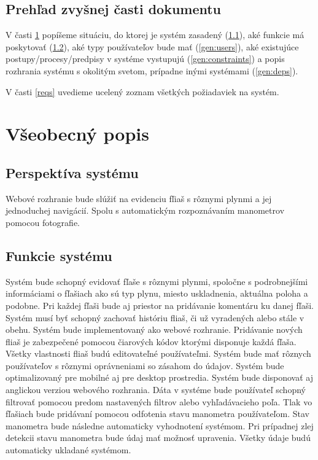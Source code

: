 \documentclass[hreffootnote]{zah}
\begin{document}
\subsection{Prehľad zvyšnej časti dokumentu}

V časti \ref{general} popíšeme situáciu, do ktorej je systém zasadený (\ref{gen:perspective}), aké funkcie má poskytovať (\ref{gen:functions}), aké typy používateľov bude mať (\ref{gen:users}), aké existujúce postupy/procesy/predpisy v systéme vystupujú (\ref{gen:constraints}) a popis rozhrania systému s okolitým svetom, prípadne inými systémami (\ref{gen:deps}).

V časti \ref{reqs} uvedieme ucelený zoznam všetkých požiadaviek na systém.

\cleardoublepage
\section{Všeobecný popis}
\label{general}

\subsection{Perspektíva systému}
\label{gen:perspective}
Webové rozhranie bude slúžiť na evidenciu fľiaš s rôznymi plynmi a jej jednoduchej navigácií. Spolu s automatickým rozpoznávaním manometrov pomocou fotografie.

\subsection{Funkcie systému}
\label{gen:functions}
Systém bude schopný evidovať fľaše s rôznymi plynmi, spoločne s podrobnejšími informáciami o fľašiach ako sú typ plynu, miesto uskladnenia, aktuálna poloha a podobne. Pri každej fľaši bude aj priestor na pridávanie komentáru ku danej fľaši. Systém musí byť schopný zachovať históriu fliaš, či už vyradených alebo stále v obehu. Systém bude implementovaný ako webové rozhranie. Pridávanie nových fliaš je zabezpečené pomocou čiarových kódov ktorými disponuje každá fľaša. Všetky vlastnosti fliaš budú editovateľné používateľmi. Systém bude mať rôznych používateľov s rôznymi oprávneniami so zásahom do údajov. Systém bude optimalizovaný pre mobilné aj pre desktop prostredia. Systém bude disponovať aj anglickou verziou webového rozhrania. Dáta v systéme bude používateľ schopný filtrovať pomocou predom nastavených filtrov alebo vyhľadávacieho poľa. Tlak vo fľašiach bude pridávaní pomocou odfotenia stavu manometra používateľom. Stav manometra bude následne automaticky vyhodnotení systémom. Pri prípadnej zlej detekcii stavu manometra bude údaj mať možnosť upravenia. Všetky údaje budú automaticky ukladané systémom.
\end{document}
